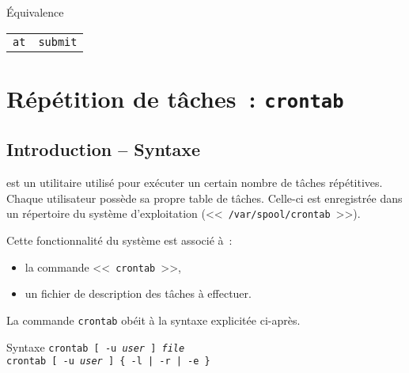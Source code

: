 \begin{definition}{\'{E}quivalence}
\begin{center}
\begin{tabular}{|c|c|}
	\hline
		{\Unix}		&	{\OpenVMS}			\\
	\hline \hline
		{\tt at}		&	{\tt submit}			\\
	\hline
\end{tabular}
\end{center}
\end{definition}

\section{R{\'e}p{\'e}tition de t{\^a}ches~: {\tt crontab}}

\subsection{Introduction -- Syntaxe}

 est un utilitaire utilis{\'e} pour ex{\'e}cuter un certain nombre de t{\^a}ches
r{\'e}p{\'e}titives. Chaque utilisateur poss{\`e}de sa propre table de t{\^a}ches. Celle-ci est
enregistr{\'e}e dans un r{\'e}pertoire du syst{\`e}me d'exploitation (<<~{\tt /var/spool/crontab}~>>).

Cette fonctionnalit{\'e} du syst{\`e}me est associ{\'e} {\`a}~:
\begin{itemize}
	\item	la commande <<~{\tt crontab}~>>,
	\item	un fichier de description des t{\^a}ches {\`a} effectuer.
\end{itemize}

La commande {\tt crontab} ob{\'e}it {\`a} la syntaxe explicit{\'e}e ci-apr{\`e}s.

\begin{definition}{Syntaxe}
{\tt crontab [ -u {\sl user} ] {\sl file}}\\
{\tt crontab [ -u {\sl user} ] \{ -l | -r | -e \}}
\end{definition}

